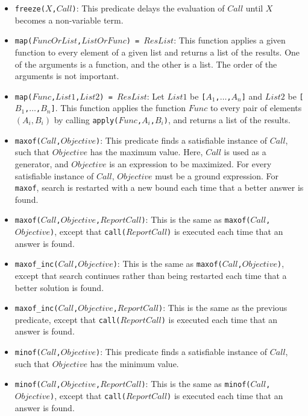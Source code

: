\begin{itemize}
\item \texttt{freeze($X$,$Call$)}: This predicate delays the evaluation of $Call$ until $X$ becomes a non-variable term.
\item \texttt{map($FuncOrList$,$ListOrFunc$) = $ResList$}: This function applies a given function to every element of a given list and returns a list of the results. One of the arguments is a function, and the other is a list. The order of the arguments is not important. 
\item \texttt{map($Func$,$List1$,$List2$) = $ResList$}: Let $List1$ be \texttt{[$A_1$,$\ldots$,$A_n$]} and $List2$ be \texttt{[$B_1$,$\ldots$,$B_n$]}. This function applies the function $Func$ to every pair of elements $(A_i,B_i)$ by calling \texttt{apply($Func$,$A_i$,$B_i$)}, and returns a list of the results.
\item \texttt{maxof($Call$,$Objective$)}: This predicate finds a satisfiable instance of $Call$, such that $Objective$ has the maximum value. Here, $Call$ is used as a generator, and $Objective$ is an expression to be maximized. For every satisfiable instance of $Call$, $Objective$ must be a ground expression. For \texttt{maxof}, search is restarted with a new bound each time that a better answer is found.
\item \texttt{maxof($Call$,$Objective$,$ReportCall$)}: This is the same as \texttt{maxof($Call$,$Objective$)}, except that \texttt{call($ReportCall$)} is executed each time that an answer is found.
\item \texttt{maxof\_inc($Call$,$Objective$)}: This is the same as \texttt{maxof($Call$,$Objective$)}, except that search continues rather than being restarted each time that a better solution is found.
\item \texttt{maxof\_inc($Call$,$Objective$,$ReportCall$)}: This is the same as the previous predicate, except that \texttt{call($ReportCall$)} is executed each time that an answer is found.
\item \texttt{minof($Call$,$Objective$)}: This predicate finds a satisfiable instance of $Call$, such that $Objective$ has the minimum value. 
\item \texttt{minof($Call$,$Objective$,$ReportCall$)}: This is the same as \texttt{minof($Call$,$Objective$)}, except that \texttt{call($ReportCall$)} is executed each time that an answer is found.

\end{itemize}
